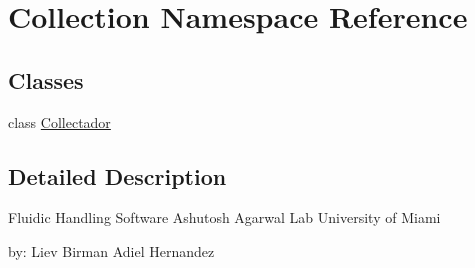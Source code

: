 \hypertarget{namespace_collection}{}\section{Collection Namespace Reference}
\label{namespace_collection}
\subsection*{Classes}
\begin{DoxyCompactItemize}
\item 
class \mbox{\hyperlink{class_collection_1_1_collectador}{Collectador}}
\end{DoxyCompactItemize}


\subsection{Detailed Description}
\begin{DoxyVerb}Fluidic Handling Software
Ashutosh Agarwal Lab
University of Miami

by:
Liev Birman
Adiel Hernandez
\end{DoxyVerb}
 